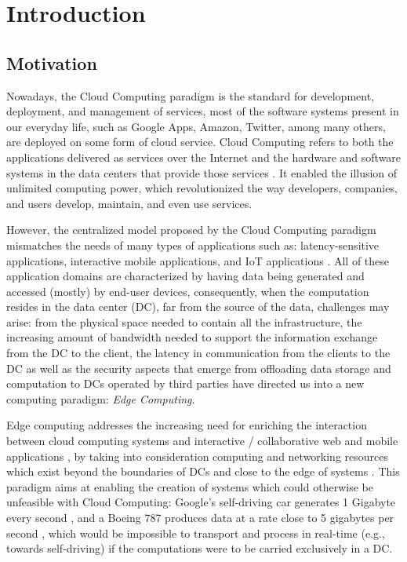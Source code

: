 

\chapter{Introduction}
\label{cha:introduction}

\section{Motivation}

Nowadays, the Cloud Computing paradigm is the standard for development, deployment, and management of services, most of the software systems present in our everyday life, such as Google Apps, Amazon, Twitter, among many others, are deployed on some form of cloud service. Cloud Computing refers to both the applications delivered as services over the Internet and the hardware and software systems in the data centers that provide those services \cite{10.1145/1721654.1721672}. It enabled the illusion of unlimited computing power, which revolutionized the way developers, companies, and users develop, maintain, and even use services.

However, the centralized model proposed by the Cloud Computing paradigm mismatches the needs of many types of applications  such as: latency-sensitive applications, interactive mobile applications, and IoT applications \cite{10.1145/3154815}. All of these application domains are characterized by having data being generated and accessed (mostly) by end-user devices, consequently, when the computation resides in the data center (DC), far from the source of the data, challenges may arise: from the physical space needed to contain all the infrastructure, the increasing amount of bandwidth needed to support the information exchange from the DC to the client, the latency in communication from the clients to the DC as well as the security aspects that emerge from offloading data storage and computation to DCs operated by third parties have directed us into a new computing paradigm: \textit{Edge Computing}.

Edge computing addresses the increasing need for enriching the interaction between cloud computing systems and interactive / collaborative web and mobile applications \cite{10.1145/242857.242867}, by taking into consideration  computing and networking resources which exist beyond the boundaries of DCs and close to the edge of systems \cite{Leitao2018} \cite{7488250}. This paradigm aims at enabling the creation of systems which could otherwise be unfeasible with Cloud Computing: Google's self-driving car generates 1 Gigabyte every second \cite{datafloq}, and a Boeing 787 produces data at a rate close to 5 gigabytes per second \cite{finnegan_2013}, which would be impossible to transport and process in real-time (e.g., towards self-driving) if the computations were to be carried exclusively in a DC.

